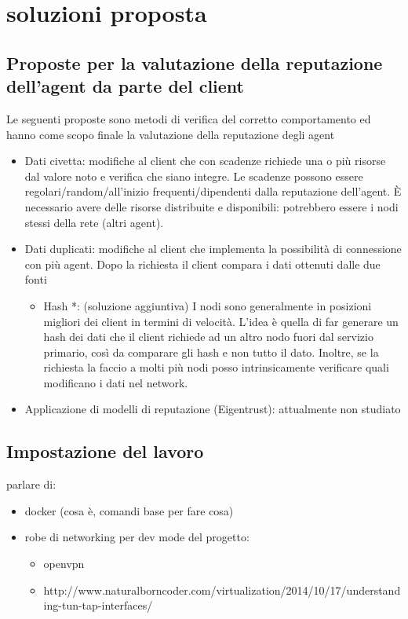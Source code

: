 \documentclass[]{article}
\begin{document}
	\section{soluzioni proposta}
	\subsection{Proposte per la valutazione della reputazione dell'agent da parte del client}
	
	Le seguenti proposte sono metodi di verifica del corretto comportamento ed hanno come scopo finale la valutazione della reputazione degli agent
	\begin{itemize}
		\item Dati civetta: modifiche al client che con scadenze richiede una o più risorse dal valore noto e verifica che siano integre. Le scadenze possono essere regolari/random/all’inizio frequenti/dipendenti dalla reputazione dell’agent. È necessario avere delle risorse distribuite e disponibili: potrebbero essere i nodi stessi della rete (altri agent).
		\item Dati duplicati: modifiche al client che implementa la possibilità di connessione con più agent. Dopo la richiesta il client compara i dati ottenuti dalle due fonti
		\begin{itemize}
			\item Hash *: (soluzione aggiuntiva) I nodi sono generalmente in posizioni migliori dei client in termini di velocità. L’idea è quella di far generare un hash dei dati che il client richiede ad un altro nodo fuori dal servizio primario, così da comparare gli hash e non tutto il dato.
			Inoltre, se la richiesta la faccio a molti più nodi posso intrinsicamente verificare quali modificano i dati nel network.
		\end{itemize}
		\item Applicazione di modelli di reputazione (Eigentrust): attualmente non studiato
	\end{itemize}

	\pagebreak
	
	

		\subsection{Impostazione del lavoro}
	parlare di:
	\begin{itemize}
		\item docker (cosa è, comandi base per fare cosa)
		\item robe di networking per dev mode del progetto:
		\begin{itemize}
			\item openvpn
			\item http://www.naturalborncoder.com/virtualization/2014/10/17/understanding-tun-tap-interfaces/
		
		\end{itemize}
	\end{itemize}
	
\end{document}
